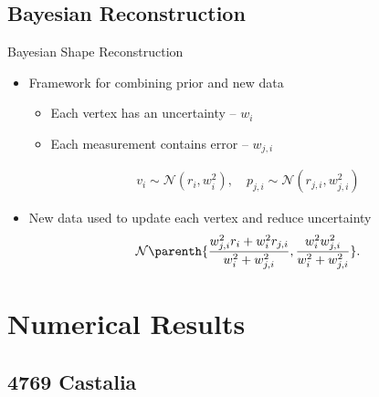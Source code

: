 \documentclass[11pt,professionalfonts]{beamer}
\begin{document}
\subsection[Reconstruction]{Bayesian Reconstruction}
\begin{frame}{Bayesian Shape Reconstruction}
    \begin{itemize}
        \item<1-> Framework for combining prior and new data 
            \begin{itemize}
                \item Each vertex has an uncertainty -- \( w_i\)
                \item Each measurement contains error -- \( w_{j, i} \)
            \end{itemize}
            \begin{align*}
                v_i \sim \mathcal{N}(r_i, w_i^2) , \quad
                p_{j,i} \sim \mathcal{N}(r_{j,i}, w_{j,i}^2)
            \end{align*}
        \item<2-> New data used to update each vertex and reduce uncertainty
    \begin{align*}\label{eq:posterior_probability}
        \mathcal{N} \parenth{\frac{w_{j, i}^2 r_i + w_i^2 r_{j, i}}{w_i^2 + w_{j, i}^2} , \frac{w_i^2  w_{j, i}^2}{w_i^2 +  w_{j, i}^2}} .
    \end{align*}
    \end{itemize}
\end{frame}

\section[Results]{Numerical Results}

\subsection[4769 Castalia]{4769 Castalia}
\end{document}

